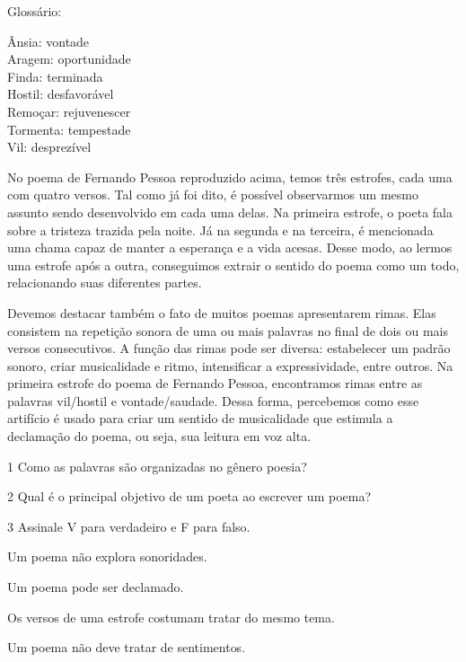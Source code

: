 {\begin{quote}
\end{quote}

Glossário:

Ânsia: vontade\\
Aragem: oportunidade\\
Finda: terminada\\
Hostil: desfavorável\\
Remoçar: rejuvenescer\\
Tormenta: tempestade\\
Vil: desprezível

No poema de Fernando Pessoa reproduzido acima, temos três estrofes, cada
uma com quatro versos. Tal como já foi dito, é possível observarmos um
mesmo assunto sendo desenvolvido em cada uma delas. Na primeira estrofe,
o poeta fala sobre a tristeza trazida pela noite. Já na segunda e na
terceira, é mencionada uma chama capaz de manter a esperança e a vida
acesas. Desse modo, ao lermos uma estrofe após a outra, conseguimos
extrair o sentido do poema como um todo, relacionando suas diferentes
partes.

Devemos destacar também o fato de muitos poemas apresentarem rimas. Elas
consistem na repetição sonora de uma ou mais palavras no final de dois
ou mais versos consecutivos. A função das rimas pode ser diversa:
estabelecer um padrão sonoro, criar musicalidade e ritmo, intensificar a
expressividade, entre outros. Na primeira estrofe do poema de Fernando
Pessoa, encontramos rimas entre as palavras vil/hostil e
vontade/saudade. Dessa forma, percebemos como esse artifício é usado
para criar um sentido de musicalidade que estimula a declamação do
poema, ou seja, sua leitura em voz alta.}


\num{1} Como as palavras são organizadas no gênero poesia?


\num{2} Qual é o principal objetivo de um poeta ao escrever um poema?


\num{3} Assinale V para verdadeiro e F para falso.

\begin{boxlist}
\item Um poema não explora sonoridades. 

\item Um poema pode ser declamado. 

\item Os versos de uma estrofe costumam tratar do mesmo tema. 

\item Um poema não deve tratar de sentimentos. 
\end{boxlist}

